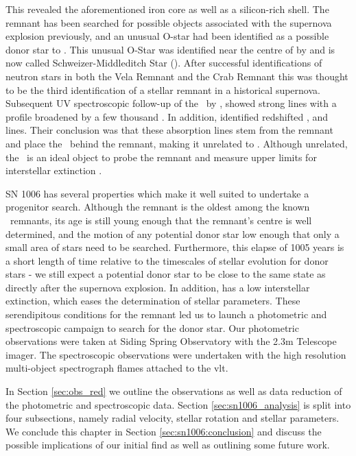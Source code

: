 This revealed the aforementioned iron core as well as a silicon-rich shell. The remnant has been searched for possible objects associated with the supernova explosion previously, and an unusual O-star had been identified as a possible donor star to . This unusual O-Star was identified near the centre of  by \citet{1980ApJ...241.1039S} and is now called Schweizer-Middleditch Star (\smstar). After successful identifications of neutron stars in both the Vela Remnant and the Crab Remnant this was thought to be the third identification of a stellar remnant in a historical supernova. Subsequent UV spectroscopic follow-up of the \smstar\ by \citet{1983ApJ...269L...5W}, showed strong  lines with a profile broadened by a few thousand \kms. In addition, \citet{1983ApJ...269L...5W} identified redshifted ,  and  lines. Their conclusion was that these absorption lines stem from the remnant and place the \smstar\ behind the remnant, making it unrelated to . Although unrelated, the \smstar\ is an ideal object to probe the remnant and measure upper limits for interstellar extinction \citep[E(B-V) = 0.1][]{1993ApJ...416..247W,2003ApJ...585..324W}.


SN 1006 has several properties which make it well suited to undertake a progenitor search.  Although the remnant is the oldest among the known \snia\ remnants, its age is still young enough that  the remnant's centre is well determined, and the motion of any potential donor star low enough that only a small area of stars need to be searched. Furthermore, this elapse of 1005 years is a short length of time relative to the timescales of stellar evolution for donor stars \cite[see][]{2000ApJS..128..615M} - we still expect a potential donor star to be close to the same state as directly after the supernova explosion. In addition,  has a low interstellar extinction, which eases the determination of stellar parameters. These serendipitous conditions for the  remnant led us to launch a photometric and spectroscopic campaign to search for the donor star. Our photometric observations were taken at Siding Spring Observatory with the 2.3m Telescope imager. The spectroscopic observations were undertaken with the high resolution multi-object spectrograph \gls{flames} attached to the \gls{vlt}.


In Section \ref{sec:obs_red} we outline the observations as well as data reduction of the photometric and spectroscopic data. Section \ref{sec:sn1006_analysis} is split into four subsections, namely radial velocity, stellar rotation and stellar parameters. We conclude this chapter in Section \ref{sec:sn1006:conclusion} and discuss the possible implications of our initial find as well as outlining some future work.


